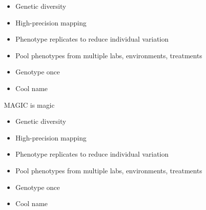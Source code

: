 \documentclass[12pt]{article}
\newcommand{\headsize}{\fontsize{35}{35} \selectfont}
\newcommand{\smallsize}{\fontsize{25}{30} \selectfont}
\begin{document}
{\vspace{25mm}

\color{mywhite}
\smallsize

\hfill \begin{minipage}{10in}
\begin{itemize}
\itemsep24pt
\item Genetic diversity

\item High-precision mapping

\item Phenotype replicates to reduce individual variation

\item Pool phenotypes from multiple labs, environments, treatments

\item Genotype once

\color{mybgcolor}
\item Cool name

\end{itemize}
\end{minipage}



\newpage

\addtocounter{page}{-1}

\headsize \color{myyellow}
\hfill \begin{minipage}{5.75in}
\centering
MAGIC is magic
\end{minipage}

\vspace{25mm}

\color{mywhite}
\smallsize

\hfill \begin{minipage}{10in}
\begin{itemize}
\itemsep24pt
\item Genetic diversity

\item High-precision mapping

\item Phenotype replicates to reduce individual variation

\item Pool phenotypes from multiple labs, environments, treatments

\item Genotype once

\color{mypink}
\item Cool name


\end{itemize}
\end{minipage}}
\end{document}
